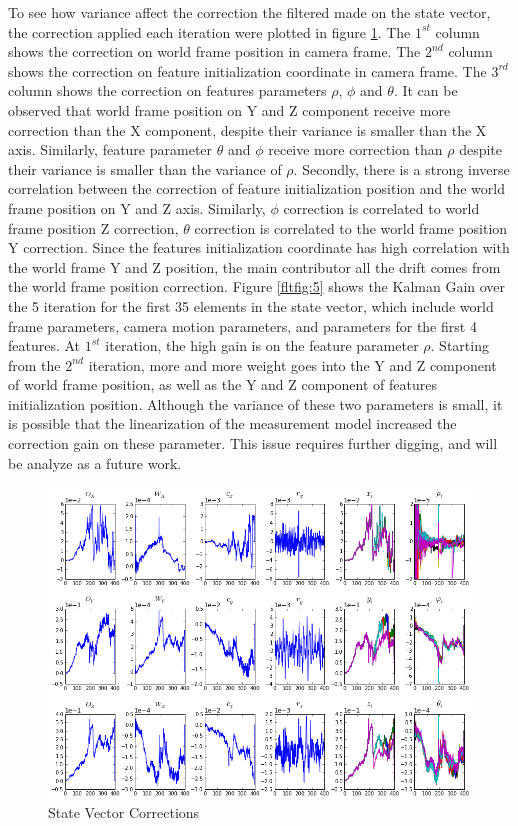To see how variance affect the correction the filtered made on the
state vector, the correction applied each iteration were plotted in
figure \ref{fltfig:4}. The $1^{st}$ column shows the correction on
world frame position in camera frame. The $2^{nd}$ column shows the
correction on feature initialization coordinate in camera frame. The
$3^{rd}$ column shows the correction on features parameters $\rho$,
$\phi$ and $\theta$. It can be observed that world frame position on Y
and Z component receive more correction than the X component, despite
their variance is smaller than the X axis. Similarly, feature
parameter $\theta$ and $\phi$ receive more correction than $\rho$
despite their variance is smaller than the variance of $\rho$.
Secondly, there is a strong inverse correlation between the correction
of feature initialization position and the world frame position on Y
and Z axis. Similarly, $\phi$ correction is correlated to world frame
position Z correction, $\theta$ correction is correlated to the world
frame position Y correction. Since the features initialization
coordinate has high correlation with the world frame Y and Z position,
the main contributor all the drift comes from the world frame position
correction. Figure \ref{fltfig:5} shows the Kalman Gain over the 5
iteration for the first 35 elements in the state vector, which include
world frame parameters, camera motion parameters, and parameters for the
first 4 features. At $1^{st}$ iteration, the high gain is on the
feature parameter $\rho$. Starting from the $2^{nd}$ iteration, more
and more weight goes into the Y and Z component of world frame
position, as well as the Y and Z component of features initialization
position. Although the variance of these two parameters is small, it
is possible that the linearization of the measurement model increased
the correction gain on these parameter. This issue requires further
digging, and will be analyze as a future work.

\begin{figure}[h]
\centering
\includegraphics[width=12cm, keepaspectratio=true]
{./Figures/fltfig/cut1/Figure112.png}
\caption{State Vector Corrections}
\label{fltfig:4}
\end{figure}

